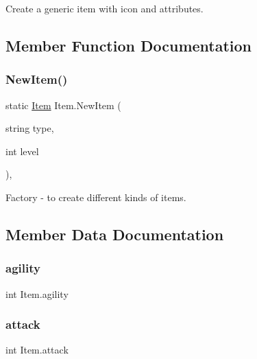 Create a generic item with icon and attributes. 



\subsection{Member Function Documentation}
\mbox{\label{class_item_ab8f02ecfdb0e7333b423635cccaac0ee}} 
\subsubsection{\texorpdfstring{NewItem()}{NewItem()}}
{\footnotesize\ttfamily static \mbox{\hyperlink{class_item}{Item}} Item.\+New\+Item (\begin{DoxyParamCaption}\item[{string}]{type,  }\item[{int}]{level }\end{DoxyParamCaption})\hspace{0.3cm}{\ttfamily [inline]}, {\ttfamily [static]}}



Factory -\/ to create different kinds of items. 



\subsection{Member Data Documentation}
\mbox{\label{class_item_a0fcb0d0a27623f05cfb0e2ac06135d86}} 
\subsubsection{\texorpdfstring{agility}{agility}}
{\footnotesize\ttfamily int Item.\+agility}

\mbox{\label{class_item_a3ce7a0eeab152f61639403838f05f0cc}} 
\subsubsection{\texorpdfstring{attack}{attack}}
{\footnotesize\ttfamily int Item.\+attack}

\mbox{\label{class_item_a925e7d3f5b5ad9195d17e4db303f86f1}} 
